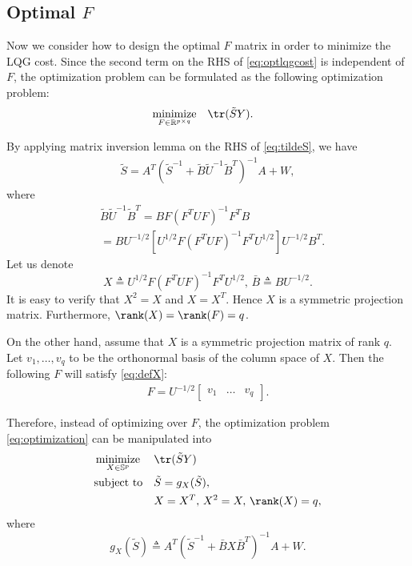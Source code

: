   \subsection{Optimal $F$}
  Now we consider how to design the optimal $F$ matrix in order to minimize the LQG cost. Since the second term on the RHS of \eqref{eq:optlqgcost} is independent of $F$, the optimization problem can be formulated as the following optimization problem: 
  \begin{align}
    &\mathop{\textrm{minimize}}\limits_{F\in\mathbb R^{p\times q}}&
    & \tr(\tilde SY). \label{eq:optimization}
  \end{align}

  By applying matrix inversion lemma on the RHS of \eqref{eq:tildeS}, we have
  \begin{align}
    \tilde S = A^T\left(\tilde S^{-1} + \tilde B \tilde U^{-1} \tilde B^T  \right)^{-1}A + W,
    \label{eq:tildeS2}
  \end{align}
  where
  \begin{align*}
    &\tilde B\tilde U^{-1}\tilde B^T = BF\left(F^TUF\right)^{-1}F^TB \\
    &= B U^{-1/2} \left[U^{1/2}F\left( F^TUF \right)^{-1}F^TU^{1/2} \right] U^{-1/2}B^T.
  \end{align*}
  Let us denote
  \begin{equation}
      X \triangleq  U^{1/2}F\left( F^TUF \right)^{-1}F^TU^{1/2},\, \bar B \triangleq BU^{-1/2}.
    \label{eq:defX}
  \end{equation}
  It is easy to verify that $X^2 = X$ and $X=X^T$. Hence $X$ is a symmetric projection matrix. Furthermore, $\rank(X) = \rank(F) = q$.

  On the other hand, assume that $X$ is a symmetric projection matrix of rank $q$. Let $v_1,\dots,v_q$ to be the orthonormal basis of the column space of $X$. Then the following $F$ will satisfy \eqref{eq:defX}:
  \begin{align}
    F = U^{-1/2} \begin{bmatrix}
      v_1 & \dots&v_q
    \end{bmatrix}.
    \label{eq:XtoF}
  \end{align}

  Therefore, instead of optimizing over $F$, the optimization problem \eqref{eq:optimization} can be manipulated into
  \begin{align}
    &\mathop{\textrm{minimize}}\limits_{X\in\mathbb S^p}&
    & \tr(\tilde SY) \label{eq:optimization2}\\
    &\textrm{subject to}&
    &\tilde S = g_X(\tilde S), \nonumber\\
    &&
    &X = X^T,\,X^2 = X,\,\rank(X) = q,\nonumber
  \end{align}
  where
  \begin{equation}
    g_X(\tilde S) \triangleq A^T\left(\tilde S^{-1} +  \bar BX\bar B^T  \right)^{-1}A + W.
    \label{eq:defriccati}
  \end{equation}

